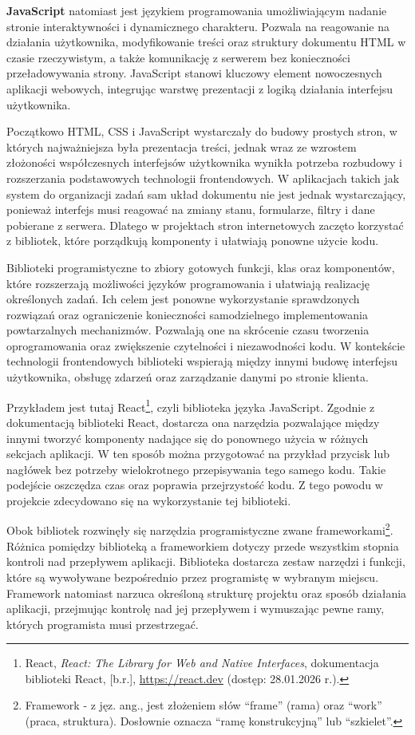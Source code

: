 \documentclass[12pt,a4paper,twoside]{report}
\begin{document}
\textbf{JavaScript} natomiast jest językiem programowania umożliwiającym nadanie stronie interaktywności i dynamicznego charakteru. Pozwala na reagowanie na działania użytkownika, modyfikowanie treści oraz struktury dokumentu HTML w czasie rzeczywistym, a także komunikację z serwerem bez konieczności przeładowywania strony. JavaScript stanowi kluczowy element nowoczesnych aplikacji webowych, integrując warstwę prezentacji z logiką działania interfejsu użytkownika.

Początkowo HTML, CSS i JavaScript wystarczały do budowy prostych stron, w których najważniejsza była prezentacja treści, jednak wraz ze wzrostem złożoności współczesnych interfejsów użytkownika wynikła potrzeba rozbudowy i rozszerzania podstawowych technologii frontendowych. W aplikacjach takich jak system do organizacji zadań sam układ dokumentu nie jest jednak wystarczający, ponieważ interfejs musi reagować na zmiany stanu, formularze, filtry i dane pobierane z serwera. Dlatego w projektach stron internetowych zaczęto korzystać z bibliotek, które porządkują komponenty i ułatwiają ponowne użycie kodu.

Biblioteki programistyczne to zbiory gotowych funkcji, klas oraz komponentów, które rozszerzają możliwości języków programowania i ułatwiają realizację określonych zadań. Ich celem jest ponowne wykorzystanie sprawdzonych rozwiązań oraz ograniczenie konieczności samodzielnego implementowania powtarzalnych mechanizmów. Pozwalają one na skrócenie czasu tworzenia oprogramowania oraz zwiększenie czytelności i niezawodności kodu. W kontekście technologii frontendowych biblioteki wspierają między innymi budowę interfejsu użytkownika, obsługę zdarzeń oraz zarządzanie danymi po stronie klienta. 

Przykładem jest tutaj React\footnote{React, \emph{React: The Library for Web and Native Interfaces}, dokumentacja biblioteki React, [b.r.], \url{https://react.dev} (dostęp: 28.01.2026 r.).}, czyli biblioteka języka JavaScript. Zgodnie z dokumentacją biblioteki React, dostarcza ona narzędzia pozwalające między innymi tworzyć komponenty nadające się do ponownego użycia w różnych sekcjach aplikacji. W ten sposób można przygotować na przykład przycisk lub nagłówek bez potrzeby wielokrotnego przepisywania tego samego kodu. Takie podejście oszczędza czas oraz poprawia przejrzystość kodu. Z tego powodu w projekcie zdecydowano się na wykorzystanie tej biblioteki.

Obok bibliotek rozwinęły się narzędzia programistyczne zwane frameworkami\footnote{Framework - z jęz. ang., jest złożeniem słów ``frame'' (rama) oraz ``work'' (praca, struktura). Dosłownie oznacza ``ramę konstrukcyjną'' lub ``szkielet''.}. Różnica pomiędzy biblioteką a frameworkiem dotyczy przede wszystkim stopnia kontroli nad przepływem aplikacji. Biblioteka dostarcza zestaw narzędzi i funkcji, które są wywoływane bezpośrednio przez programistę w wybranym miejscu. Framework natomiast narzuca określoną strukturę projektu oraz sposób działania aplikacji, przejmując kontrolę nad jej przepływem i wymuszając pewne ramy, których programista musi przestrzegać.
\end{document}
